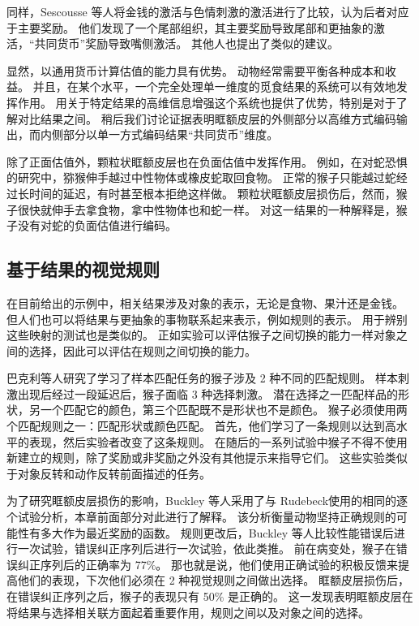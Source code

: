 同样，Sescousse 等人\cite{sescousse2010architecture}将金钱的激活与色情刺激的激活进行了比较，认为后者对应于主要奖励。
他们发现了一个尾部组织，其主要奖励导致尾部和更抽象的激活，“共同货币”奖励导致嘴侧激活。
其他人也提出了类似的建议\cite{kringelbach2004functional}。\par


显然，以通用货币计算估值的能力具有优势。
动物经常需要平衡各种成本和收益。
并且，在某个水平，一个完全处理单一维度的觅食结果的系统可以有效地发挥作用。
用关于特定结果的高维信息增强这个系统也提供了优势，特别是对于了解对比结果之间。
稍后我们讨论证据表明眶额皮层的外侧部分以高维方式编码输出，而内侧部分以单一方式编码结果“共同货币”维度。\par


除了正面估值外，颗粒状眶额皮层也在负面估值中发挥作用。
例如，在对蛇恐惧的研究中，猕猴伸手越过中性物体或橡皮蛇取回食物。
正常的猴子只能越过蛇经过长时间的延迟，有时甚至根本拒绝这样做。
颗粒状眶额皮层损伤后，然而，猴子很快就伸手去拿食物，拿中性物体也和蛇一样\cite{izquierdo2005comparison}。
对这一结果的一种解释是，猴子没有对蛇的负面估值进行编码。
\par



\subsection{基于结果的视觉规则}

在目前给出的示例中，相关结果涉及对象的表示，无论是食物、果汁还是金钱。
但人们也可以将结果与更抽象的事物联系起来表示，例如规则的表示。
用于辨别这些映射的测试也是类似的。
正如实验可以评估猴子之间切换的能力一样对象之间的选择，因此可以评估在规则之间切换的能力。\par


巴克利等人\cite{buckley2009dissociable}研究了学习了样本匹配任务的猴子涉及 2 种不同的匹配规则。
样本刺激出现后经过一段延迟后，猴子面临 3 种选择刺激。
潜在选择之一匹配样品的形状，另一个匹配它的颜色，第三个匹配既不是形状也不是颜色。
猴子必须使用两个匹配规则之一：匹配形状或颜色匹配。
首先，他们学习了一条规则以达到高水平的表现，然后实验者改变了这条规则。
在随后的一系列试验中猴子不得不使用新建立的规则，除了奖励或非奖励之外没有其他提示来指导它们。
这些实验类似于对象反转和动作反转前面描述的任务。\par


为了研究眶额皮层损伤的影响，Buckley 等人采用了与 Rudebeck\cite{rudebeck2008frontal}使用的相同的逐个试验分析，本章前面部分对此进行了解释。
该分析衡量动物坚持正确规则的可能性有多大作为最近奖励的函数。
规则更改后，Buckley 等人比较性能错误后进行一次试验，错误纠正序列后进行一次试验，依此类推。
前在病变处，猴子在错误纠正序列后的正确率为 77\%。
那也就是说，他们使用正确试验的积极反馈来提高他们的表现，下次他们必须在 2 种视觉规则之间做出选择。
眶额皮层损伤后，在错误纠正序列之后，猴子的表现只有 50\% 是正确的。
这一发现表明眶额皮层在将结果与选择相关联方面起着重要作用，规则之间以及对象之间的选择。\par



